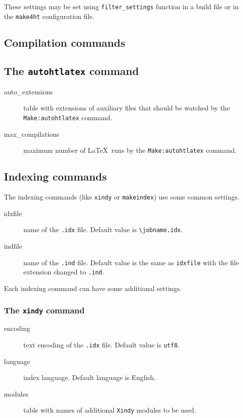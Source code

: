 These settings may be set using \texttt{filter\_settings} function in a
build file or in the \texttt{make4ht} configuration file.

\subsection{Compilation commands}\label{compilation-commands}

\subsection{\texorpdfstring{The \texttt{autohtlatex}
command}{The autohtlatex command}}\label{the-autohtlatex-command}

\begin{description}
\item[auto\_extensions]
table with extensions of auxiliary files that should be watched by the
\texttt{Make:autohtlatex} command.
\item[max\_compilations]
maximum number of \LaTeX~runs by the \texttt{Make:autohtlatex} command.
\end{description}

\subsection{Indexing commands}\label{indexing-commands}

The indexing commands (like \texttt{xindy} or \texttt{makeindex}) use
some common settings.

\begin{description}
\item[idxfile]
name of the \texttt{.idx} file. Default value is
\texttt{\textbackslash{}jobname.idx}.
\item[indfile]
name of the \texttt{.ind} file. Default value is the same as
\texttt{idxfile} with the file extension changed to \texttt{.ind}.
\end{description}

Each indexing command can have some additional settings.

\subsubsection{\texorpdfstring{The \texttt{xindy}
command}{The xindy command}}\label{the-xindy-command}

\begin{description}
\item[encoding]
text encoding of the \texttt{.idx} file. Default value is \texttt{utf8}.
\item[language]
index language. Default language is English.
\item[modules]
table with names of additional \texttt{Xindy} modules to be used.
\end{description}

